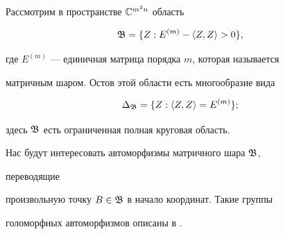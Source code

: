 Рассмотрим в пространстве $\Bbb C^{m^2n}$ область 


\begin{equation} 


\frak B=\{Z:E^{(m)}-\la Z,Z\ra>0\}, 


\end{equation} 


где $E^{(m)}$ --- единичная матрица порядка $m$, которая называется 


матричным шаром. Остов этой области есть многообразие вида


\begin{equation} 


\Delta_{\frak B}=\{Z:\la Z,Z\ra=E^{(m)}\};


\end{equation} 


здесь $\frak B$ есть ограниченная полная круговая область. 


 


Нас будут интересовать автоморфизмы матричного шара $\frak B$, 


переводящие 


произвольную точку $B\in\frak B$ в начало координат. Такие группы 


голоморфных автоморфизмов описаны в \cite{4}. 


 


